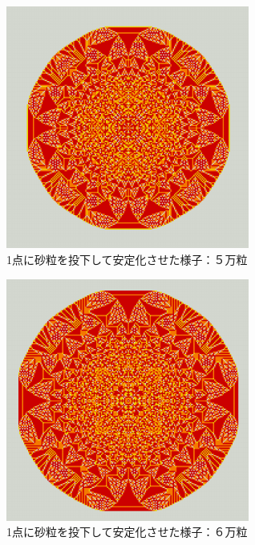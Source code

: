 \documentclass[lualatex,12pt,ja=standard]{bxjsreport}
\begin{document}
\begin{center}
 \begin{figure}[H]
  \begin{center}
   \includegraphics[bb=0 0 896 893,clip,width=8cm]{figures/onePoint50000.png}
  \end{center}
  \caption{1点に砂粒を投下して安定化させた様子：５万粒}
 \end{figure}
\end{center}

\begin{center}
 \begin{figure}[H]
  \begin{center}
   \includegraphics[bb=0 0 896 893,clip,width=8cm]{figures/onePoint6000.png}
  \end{center}
  \caption{1点に砂粒を投下して安定化させた様子：６万粒}
 \end{figure}
\end{center}
\end{document}
